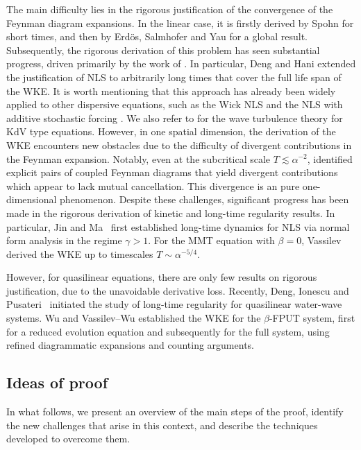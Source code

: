 \documentclass[UTF-8,reqno]{amsart}
\numberwithin{equation}{section}
\theoremstyle{definition}
\begin{document}
The main difficulty lies in the rigorous justification of the convergence of the Feynman diagram expansions. In the linear case, it is firstly derived by   Spohn \cite{Spo77} for short times, and then by  Erd\"os, Salmhofer and Yau \cite{ESY03b,EY00} for a global result.  
Subsequently, the rigorous derivation of this problem has seen substantial progress, driven primarily by the work of  \cite{BGHS18,BGHS21,CG20,CG25,DH21,DH23a,DH23b}. In particular, Deng and Hani \cite{DH23c}  extended the  justification of NLS to
 arbitrarily long times that cover the full life span of the WKE. It is worth mentioning that this approach has already been widely applied to other dispersive equations, such as the Wick  NLS \cite{HSZ24} and the NLS with additive stochastic forcing \cite{GH24}. We also refer to \cite{ST21,HRST22} for the wave turbulence theory for   KdV
 type equations.
However, in one spatial dimension, the derivation of the WKE encounters new obstacles due to the difficulty of  divergent contributions in the Feynman expansion. Notably, even at the subcritical scale $T \lesssim   \alpha^{-2}$, \cite{DIP25} identified explicit pairs of coupled Feynman diagrams that yield divergent contributions which appear to lack mutual cancellation. This divergence is an pure one-dimensional phenomenon. 
 Despite these challenges, significant progress has been made in the rigorous derivation of kinetic and long-time regularity results. In particular, Jin and  Ma~\cite{JM21} first established long-time dynamics for NLS via normal form analysis in the regime $ \gamma > 1 $. For the MMT equation with $ \beta = 0 $, Vassilev~\cite{Vas24} derived the WKE up to timescales $ T \sim \alpha^{-5/4} $.
 
However, for quasilinear equations, there are only few results on rigorous justification, due to the unavoidable
derivative loss. Recently, Deng, Ionescu and Pusateri~\cite{DIP25a,DIP25} initiated the study of long-time regularity for quasilinear water-wave systems. Wu \cite{Wu25} and Vassilev--Wu \cite{VW26} established the WKE for the $\beta$-FPUT system, first for a reduced evolution equation and subsequently for the full system, using refined diagrammatic expansions and counting arguments.
 

\subsection{Ideas of proof}\label{sec:ideaproof}
In what follows, we present an overview of the main steps of the proof, identify the new challenges that arise in this context, and describe the techniques developed to overcome them.
\end{document}
